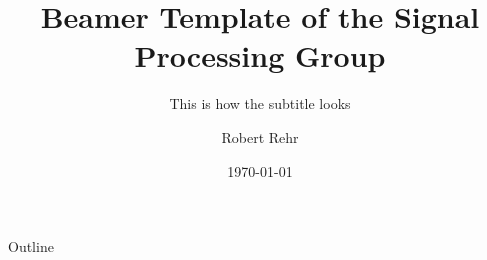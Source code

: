 \documentclass[10pt]{beamer}
\title[This is the short title]{Beamer Template of the Signal Processing Group}
\subtitle{This is how the subtitle looks}
\author[Short Name]{Robert Rehr}
\institute[Uni Hamburg]{University of Hamburg\\ Department of Informatics}
\date{\today}
\begin{document}
\begin{frame}[plain]
    \maketitle
\end{frame}

\begin{frame}{Outline}
    \tableofcontents
\end{frame}












\end{document}
